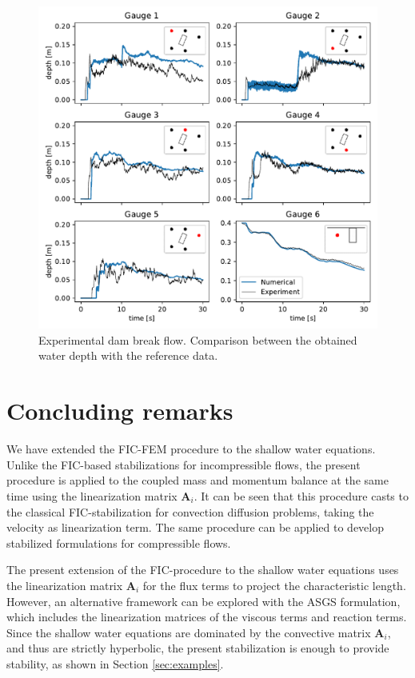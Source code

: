 \documentclass[a4paper,12pt]{article}
\begin{document}
\begin{figure}
\centering
\includegraphics[width=\textwidth]{img/exp/gauges.pdf}
\caption{Experimental dam break flow. Comparison between the obtained water depth with the reference data.}
\label{experiment_gauges}
\end{figure}



\section{Concluding remarks} \label{sec:conclusions}

We have extended the FIC-FEM procedure to the shallow water equations. Unlike the FIC-based stabilizations for incompressible flows, the present procedure is applied to the coupled mass and momentum balance at the same time using the linearization matrix $\mathbf{A}_i$. It can be seen that this procedure casts to the classical FIC-stabilization for convection diffusion problems, taking the velocity as linearization term. The same procedure can be applied to develop stabilized formulations for compressible flows.

The present extension of the FIC-procedure to the shallow water equations uses the linearization matrix $\mathbf{A}_i$ for the flux terms to project the characteristic length. However, an alternative framework can be explored with the ASGS \cite{hughes1995,codina2008} formulation, which includes the linearization matrices of the viscous terms and reaction terms. Since the shallow water equations are dominated by the convective matrix $\mathbf{A}_i$, and thus are strictly hyperbolic, the present stabilization is enough to provide stability, as shown in Section \ref{sec:examples}.
\end{document}
